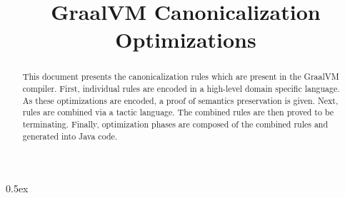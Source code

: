 \documentclass[11pt,a4paper]{article}
\begin{document}
\title{GraalVM Canonicalization Optimizations}
\maketitle

\begin{abstract}
This document presents the canonicalization rules
which are present in the GraalVM compiler.
First, individual rules are encoded in a high-level
domain specific language.
As these optimizations are encoded, a proof of semantics
preservation is given.
Next, rules are combined via a tactic language.
The combined rules are then proved to be terminating.
Finally, optimization phases are composed of the combined rules
and generated into Java code.
\end{abstract}

\pagebreak

\tableofcontents

\pagebreak

\parindent 0pt\parskip 0.5ex



%
%
\end{document}

